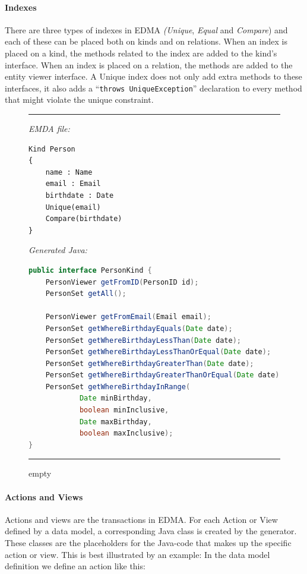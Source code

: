 \paragraph{Indexes}

There are three types of indexes in EDMA\emph{ (Unique}, \emph{Equal}
and \emph{Compare}) and each of these can be placed both on kinds
and on relations. When an index is placed on a kind, the methods related
to the index are added to the kind's interface. When an index is placed
on a relation, the methods are added to the entity viewer interface.
A Unique index does not only add extra methods to these interfaces,
it also adds a ``\texttt{throws UniqueException}'' declaration to
every method that might violate the unique constraint.

\begin{figure}[h]
\rule{\textwidth}{.1mm}
\emph{EMDA file:}
\begin{lstlisting}[language=EDMA, frame=none, tabsize=4]
Kind Person
{
	name : Name
	email : Email
	birthdate : Date
	Unique(email)
	Compare(birthdate)
}
\end{lstlisting}
\emph{Generated Java:}
\begin{lstlisting}[language=java, frame=none, tabsize=4]
public interface PersonKind {
	PersonViewer getFromID(PersonID id);
	PersonSet getAll();
	
	PersonViewer getFromEmail(Email email);
	PersonSet getWhereBirthdayEquals(Date date);
	PersonSet getWhereBirthdayLessThan(Date date);
	PersonSet getWhereBirthdayLessThanOrEqual(Date date);
	PersonSet getWhereBirthdayGreaterThan(Date date);
	PersonSet getWhereBirthdayGreaterThanOrEqual(Date date);
	PersonSet getWhereBirthdayInRange(
			Date minBirthday, 
			boolean minInclusive,
			Date maxBirthday,
			boolean maxInclusive);
}
\end{lstlisting}
\rule{\textwidth}{.1mm}
\caption{empty}
\label{fig:empty}
\end{figure}


\paragraph{Actions and Views}

Actions and views are the transactions in EDMA. For each Action or
View defined by a data model, a corresponding Java class is created
by the generator. These classes are the placeholders for the Java-code
that makes up the specific action or view. This is best illustrated
by an example: In the data model definition we define an action like
this:

